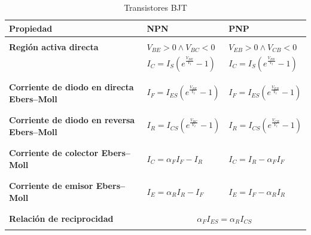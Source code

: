 \documentclass[11pt]{article}
\begin{document}
	\begin{table}
		\centering
		\begin{tabular}{|p{4.2cm}|l|l|}
			\hline
			Propiedad & NPN & PNP \\
			\hline
			&&\\
			\textbf{Región activa directa}
			& $V_{BE} > 0 \land V_{BC} < 0$
			& $V_{EB} > 0 \land V_{CB} < 0$ \\
			& $I_C = I_S\left(e^{\frac{V_{BE}}{V_t}} - 1\right)$\color{red}{$\left(1 + \dfrac{V_{CE}}{V_A}\right)$}
			& $I_C = I_S\left(e^{\frac{V_{EB}}{V_t}} - 1\right)$\color{red}{$\left(1 + \dfrac{V_{EC}}{V_A}\right)$} \\
			&&\\
			\hline
			&&\\
			\textbf{Corriente de diodo en directa Ebers--Moll}
			& $I_F = I_{ES}\left(e^{\frac{V_{BE}}{V_t}} - 1\right)$
			& $I_F = I_{ES}\left(e^{\frac{V_{EB}}{V_t}} - 1\right)$ \\
			&&\\
			\hline
			&&\\
			\textbf{Corriente de diodo en reversa Ebers--Moll}
			& $I_R = I_{CS}\left(e^{\frac{V_{BC}}{V_t}} - 1\right)$
			& $I_R = I_{CS}\left(e^{\frac{V_{CB}}{V_t}} - 1\right)$ \\
			&&\\
			\hline
			&&\\
			\textbf{Corriente de colector Ebers--Moll}
			& $I_C = \alpha_F I_F - I_R$
			& $I_C = I_R - \alpha_F I_F$ \\
			&&\\
			\hline
			&&\\
			\textbf{Corriente de emisor Ebers--Moll}
			& $I_E = \alpha_R I_R - I_F$
			& $I_E = I_F - \alpha_R I_R$ \\
			&&\\
			\hline
			&\multicolumn{2}{|c|}{} \\
			\textbf{Relación de reciprocidad}
			& \multicolumn{2}{|c|}{$\alpha_F I_{ES} = \alpha_R I_{CS}$} \\
			&\multicolumn{2}{|c|}{} \\
			\hline
		\end{tabular}
		\caption{Transistores BJT}
	\end{table}
\end{document}
